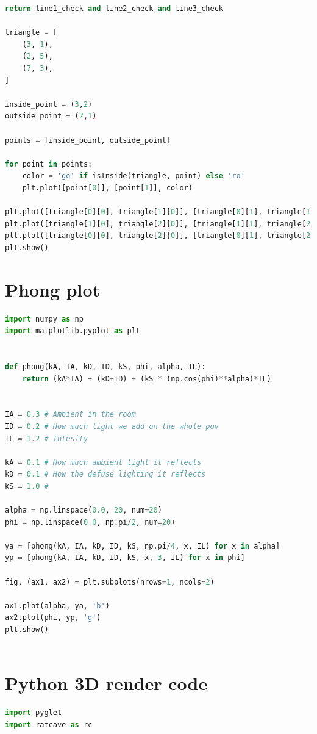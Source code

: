 \documentclass{article}
\begin{document}
\begin{appendices}
\begin{lstlisting}[language=python]
    return line1_check and line2_check and line3_check

triangle = [
    (3, 1),
    (2, 5),
    (7, 3),
]

inside_point = (3,2)
outside_point = (2,1)

points = [inside_point, outside_point]

for point in points:
    color = 'go' if isInside(triangle, point) else 'ro'
    plt.plot([point[0]], [point[1]], color)

plt.plot([triangle[0][0], triangle[1][0]], [triangle[0][1], triangle[1][1]], 'b')
plt.plot([triangle[1][0], triangle[2][0]], [triangle[1][1], triangle[2][1]], 'b')
plt.plot([triangle[0][0], triangle[2][0]], [triangle[0][1], triangle[2][1]], 'b')
plt.show()
        \end{lstlisting}
        \section{Phong plot}
        \label{appendix:pho}
        \begin{lstlisting}[language=python]
import numpy as np
import matplotlib.pyplot as plt


def phong(kA, IA, kD, ID, kS, phi, alpha, IL):
    return (kA*IA) + (kD+ID) + (kS * (np.cos(phi)**alpha)*IL)


IA = 0.3 # Ambient in the room
ID = 0.2 # How much light we add on the whole pov
IL = 1.2 # Intesity 

kA = 0.1 # How much ambient light it reflects
kD = 0.1 # How the defuse lighting it reflects
kS = 1.0 # 

alpha = np.linspace(0.0, 20, num=20)
phi = np.linspace(0.0, np.pi/2, num=20)

ya = [phong(kA, IA, kD, ID, kS, np.pi/4, x, IL) for x in alpha]
yp = [phong(kA, IA, kD, ID, kS, x, 3, IL) for x in phi]

fig, (ax1, ax2) = plt.subplots(nrows=1, ncols=2)

ax1.plot(alpha, ya, 'b')
ax2.plot(phi, yp, 'g')
plt.show()
            

        \end{lstlisting}

        \section{Python 3D render code}
        \label{appendix:3dCode}
        \begin{lstlisting}[language=python]
import pyglet
import ratcave as rc


\end{lstlisting}
\end{appendices}
\end{document}
